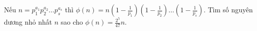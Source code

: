 \ifshowproblem
\begin{problem}\label{example:CHN-2015-NMO-10-P3}
    Nếu $n = p_1^{a_1} p_2^{a_2} \ldots p_s^{a_s}$ thì $\phi(n) = n \left(1 - \frac{1}{p_1}\right)\left(1 - \frac{1}{p_2}\right)\ldots\left(1 - \frac{1}{p_s}\right)$.
    Tìm số nguyên dương nhỏ nhất $n$ sao cho $\phi(n) = \frac{2^5}{47}n.$
\end{problem}
\fi

\footnotemark
{}
\fi